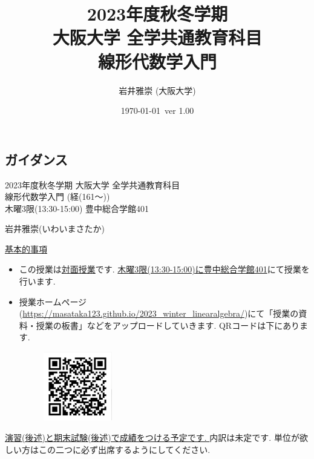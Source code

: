 \documentclass[dvipdfmx,a4paper,11pt]{article}
\title{2023年度秋冬学期 \\ 大阪大学 全学共通教育科目 \\ 線形代数学入門 }
\author{岩井雅崇 (大阪大学)}
\date{\today \, ver 1.00}
\theoremstyle{definition}
\begin{document}
\maketitle
\tableofcontents
\newpage

\begin{center}
\setcounter{section}{-1}
\section{ガイダンス}
\label{sec-guide}
\end{center}

\begin{center}
{\Large 2023年度秋冬学期 大阪大学 全学共通教育科目 \\ 線形代数学入門 (経(161〜))} \\
木曜3限(13:30-15:00) 豊中総合学館401
\end{center}
\begin{flushright}
 岩井雅崇(いわいまさたか) \\
\end{flushright}
{\Large \underline{基本的事項}}
\begin{itemize}
  \setlength{\parskip}{0cm} %
  \setlength{\itemsep}{0cm} %
\item この授業は\underline{対面授業}です. \underline{木曜3限(13:30-15:00)に豊中総合学館401}にて授業を行います.
\item 授業ホームページ(\url{https://masataka123.github.io/2023_winter_linearalgebra/})にて「授業の資料・授業の板書」などをアップロードしていきます. 
QRコードは下にあります.
\begin{figure}[htbp]
\begin{center}
 \includegraphics[height=30mm, width=30mm]{linalg.png}
\end{center}
\end{figure}
\end{itemize}


\underline{演習(後述)と期末試験(後述)で成績をつける予定です. } 内訳は未定です. 単位が欲しい方はこの二つに必ず出席するようにしてください. 
\end{document}
